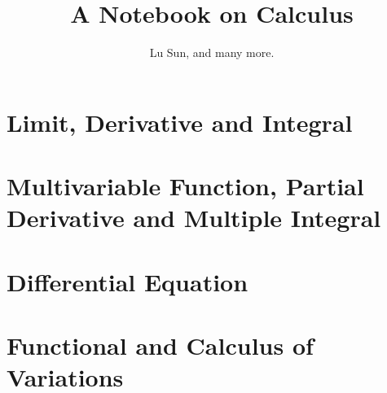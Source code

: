 \documentclass[krantz1,ChapterTOCs]{krantz}
\begin{document}
\frontmatter

\title{A Notebook on Calculus}
\author{Lu Sun, and many more.}

\maketitle


\tableofcontents


\listoffigures
\listoftables
%
%

\mainmatter

\part{Limit, Derivative and Integral}








\part{Multivariable Function, Partial Derivative and Multiple Integral}









\part{Differential Equation}

\part{Functional and Calculus of Variations}




\printindex
\end{document}

